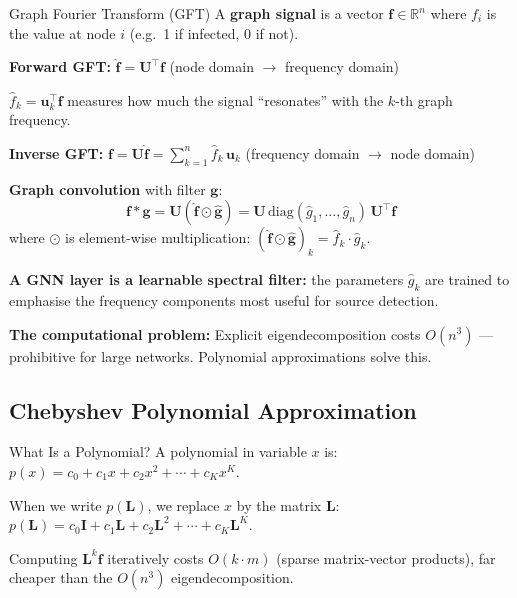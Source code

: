 \begin{mathbox}{Graph Fourier Transform (GFT)}
A \textbf{graph signal} is a vector $\mathbf{f} \in \mathbb{R}^n$ where $f_i$ is the value at node $i$ (e.g.\ 1 if infected, 0 if not).

\textbf{Forward GFT:} $\hat{\mathbf{f}} = \mathbf{U}^\top \mathbf{f}$ \quad (node domain $\to$ frequency domain)

$\hat{f}_k = \mathbf{u}_k^\top \mathbf{f}$ measures how much the signal ``resonates'' with the $k$-th graph frequency.

\textbf{Inverse GFT:} $\mathbf{f} = \mathbf{U}\hat{\mathbf{f}} = \sum_{k=1}^{n} \hat{f}_k\, \mathbf{u}_k$ \quad (frequency domain $\to$ node domain)

\textbf{Graph convolution} with filter $\mathbf{g}$:
\[
\mathbf{f} * \mathbf{g} = \mathbf{U}\!\left(\hat{\mathbf{f}} \odot \hat{\mathbf{g}}\right) = \mathbf{U}\,\mathrm{diag}(\hat{g}_1, \dots, \hat{g}_n)\,\mathbf{U}^\top\mathbf{f}
\]
where $\odot$ is element-wise multiplication: $(\hat{\mathbf{f}} \odot \hat{\mathbf{g}})_k = \hat{f}_k \cdot \hat{g}_k$.

\textbf{A GNN layer is a learnable spectral filter:} the parameters $\hat{g}_k$ are trained to emphasise the frequency components most useful for source detection.

\textbf{The computational problem:} Explicit eigendecomposition costs $O(n^3)$ --- prohibitive for large networks. Polynomial approximations solve this.
\end{mathbox}

\subsection{Chebyshev Polynomial Approximation}

\begin{mathbox}{What Is a Polynomial?}
A polynomial in variable $x$ is: $p(x) = c_0 + c_1 x + c_2 x^2 + \cdots + c_K x^K$.

When we write $p(\mathbf{L})$, we replace $x$ by the matrix $\mathbf{L}$:
$p(\mathbf{L}) = c_0 \mathbf{I} + c_1 \mathbf{L} + c_2 \mathbf{L}^2 + \cdots + c_K \mathbf{L}^K$.

Computing $\mathbf{L}^k\mathbf{f}$ iteratively costs $O(k \cdot m)$ (sparse matrix-vector products), far cheaper than the $O(n^3)$ eigendecomposition.
\end{mathbox}

